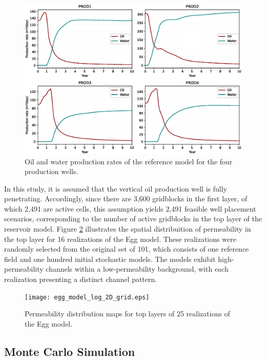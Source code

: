 \documentclass[pdflatex,sn-basic]{sn-jnl}%
\theoremstyle{thmstyleone}%
\theoremstyle{thmstyletwo}%
\theoremstyle{thmstylethree}%
\begin{document}
\begin{figure}[H]
\centering
\begin{minipage}{0.95\textwidth}
  \includegraphics[width=\textwidth]{production_plot.eps}
  \caption{Oil and water production rates of the reference model for the four production wells.}
  \label{fig4}
\end{minipage}
\end{figure}

In this study, it is assumed that the vertical oil production well is fully penetrating. Accordingly, since there are 3,600 gridblocks in the first layer, of which 2,491 are active cells, this assumption yields 2,491 feasible well placement scenarios, corresponding to the number of active gridblocks in the top layer of the reservoir model. Figure \ref{fig5} illustrates the spatial distribuition of permeability in the top layer for 16 realizations of the Egg model. These realizations were randomly selected from the original set of 101, which consists of one reference field and one hundred initial stochastic models. The models exhibit high-permeability channels within a low-permeability background, with each realization presenting a distinct channel pattern.

\begin{figure}[H]
\centering
\begin{minipage}{0.95\textwidth}
  \texttt{[image: egg\_model\_log\_2D\_grid.eps]}
  \caption{Permeability distribution maps for top layers of 25 realizations of the Egg model.}
  \label{fig5}
\end{minipage}
\end{figure}

\subsection{Monte Carlo Simulation}\label{subsec42}
\end{document}
